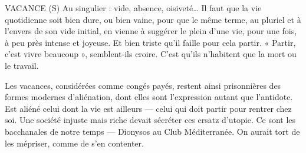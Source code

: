 
VACANCE (S) Au singulier : vide, absence, oisiveté… Il faut que la vie quotidienne
soit bien dure, ou bien vaine, pour que le même
terme, au pluriel et à l'envers de son vide initial, en vienne à suggérer le plein
d’une vie, pour une fois, à peu près intense et joyeuse. Et bien triste qu’il
faille pour cela partir. « Partir, c’est vivre beaucoup », semblent-ils croire. C’est
qu’ils n’habitent que la mort ou le travail.

Les vacances, considérées comme congés payés, restent ainsi prisonnières
des formes modernes d’aliénation, dont elles sont l'expression autant que l’antidote.
Est aliéné celui dont la vie est ailleurs — celui qui doit partir pour rentrer
chez soi. Une société injuste mais riche devait sécréter ces ersatz d’utopie. Ce
sont les bacchanales de notre temps — Dionysos au Club Méditerranée. On
aurait tort de les mépriser, comme de s’en contenter.

